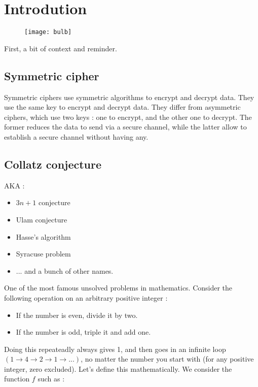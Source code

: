 \section{Introdution}

\begin{figure}[H]
    \centering
    \texttt{[image: bulb]}
\end{figure}

First, a bit of context and reminder.

\subsection{Symmetric cipher}

Symmetric ciphers use symmetric algorithms to encrypt and decrypt data. They use the same key to encrypt and decrypt data.
They differ from asymmetric ciphers, which use two keys : one to encrypt, and the other one to decrypt. The former reduces 
the data to send via a secure channel, while the latter allow to establish a secure channel without having any.

\subsection{Collatz conjecture}

AKA :

\begin{itemize}
    \item $3n + 1$ conjecture
    \item Ulam conjecture
    \item Hasse's algorithm
    \item Syracuse problem
    \item ... and a bunch of other names.
\end{itemize}
One of the most famous unsolved problems in mathematics. Consider the following operation on an arbitrary positive 
integer :

\begin{itemize}
    \item If the number is even, divide it by two.
    \item If the number is odd, triple it and add one.
\end{itemize}
Doing this repeateadly always gives 1, and then goes in an infinite loop $(1 \rightarrow 4 \rightarrow 2 \rightarrow 1 
\rightarrow ...)$, no matter the number you start with (for any positive integer, zero excluded).
\newline
\newline
Let's define this mathematically.
\newline
\newline
We consider the function $f$ such as :


